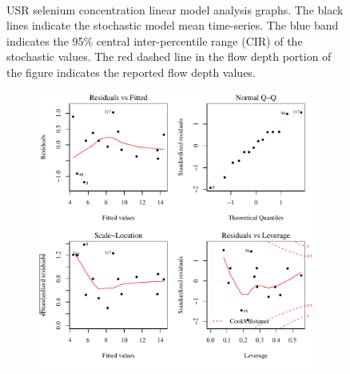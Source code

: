 \begin{linenumbers}
\begin{landscape}
\begin{figure}
\begin{subfigure}{0.7\textwidth}
		\end{subfigure}\\
		\caption[USR selenium concentration linear model analysis graphs.]{USR selenium concentration linear model analysis graphs. The black lines indicate the stochastic model mean time-series.  The blue band indicates the 95\% central inter-percentile range (CIR) of the stochastic values.  The red dashed line in the flow depth portion of the figure indicates the reported flow depth values.}
		\label{fig:concLmFit_US}
	\end{figure}
\end{landscape}

\subfiguremid
\begin{landscape}
	\begin{figure}
		\begin{subfigure}{0.7\textwidth}
			\centering
			\includegraphics[width=\tableCustomSize]{"Figures/Results_USR/Stochastic/Conc Model lm-fit U167"}
		\end{subfigure}%
		\begin{subfigure}{0.7\textwidth}
			\centering

\end{subfigure}
\end{figure}
\end{landscape}
\end{linenumbers}
